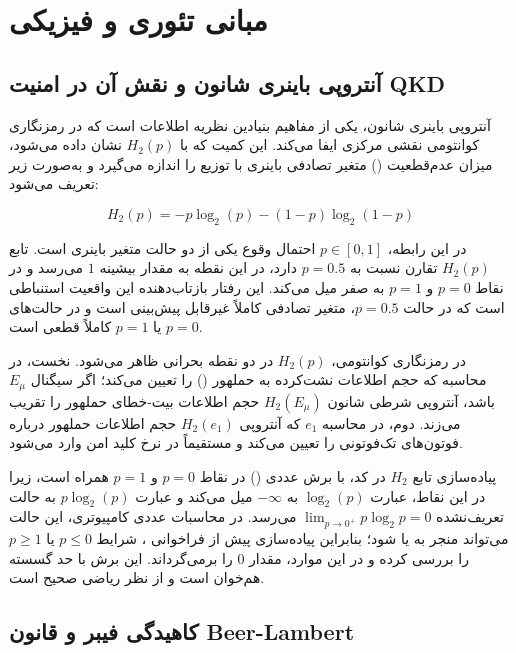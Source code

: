 \section{مبانی تئوری و فیزیکی}

\subsection{آنتروپی باینری شانون و نقش آن در امنیت QKD}

آنتروپی باینری شانون، یکی از مفاهیم بنیادین نظریه اطلاعات است که در رمزنگاری کوانتومی نقشی مرکزی ایفا می‌کند. این کمیت که با $H_2(p)$ نشان داده می‌شود، میزان عدم‌قطعیت () متغیر تصادفی باینری با توزیع  را اندازه می‌گیرد و به‌صورت زیر تعریف می‌شود:

\begin{equation}
	H_2(p) = -p \log_2(p) - (1 - p) \log_2(1 - p)
\end{equation}

در این رابطه، $p \in [0, 1]$ احتمال وقوع یکی از دو حالت متغیر باینری است. تابع $H_2(p)$ تقارن نسبت به $p = 0.5$ دارد، در این نقطه به مقدار بیشینه $1$ می‌رسد و در نقاط $p = 0$ و $p = 1$ به صفر میل می‌کند. این رفتار بازتاب‌دهنده این واقعیت استنباطی است که در حالت $p = 0.5$، متغیر تصادفی کاملاً غیرقابل پیش‌بینی است و در حالت‌های $p = 0$ یا $p = 1$ کاملاً قطعی است.

در رمزنگاری کوانتومی، $H_2(p)$ در دو نقطه بحرانی ظاهر می‌شود. نخست، در محاسبه  که حجم اطلاعات نشت‌کرده به حملهور () را تعیین می‌کند؛ اگر  سیگنال $E_\mu$ باشد، آنتروپی شرطی شانون $H_2(E_\mu)$ حجم اطلاعات بیت-خطای حملهور را تقریب می‌زند. دوم، در محاسبه  $e_1$ که آنتروپی $H_2(e_1)$ حجم اطلاعات حملهور درباره فوتون‌های تک‌فوتونی را تعیین می‌کند و مستقیماً در نرخ کلید امن وارد می‌شود.

پیاده‌سازی تابع $H_2$ در کد، با برش عددی () در نقاط $p = 0$ و $p = 1$ همراه است، زیرا در این نقاط، عبارت $\log_2(p)$ به $-\infty$ میل می‌کند و عبارت $p \log_2(p)$ به حالت تعریف‌نشده $\lim_{p \to 0^+} p \log_2 p = 0$ می‌رسد. در محاسبات عددی کامپیوتری، این حالت می‌تواند منجر به  یا  شود؛ بنابراین پیاده‌سازی پیش از فراخوانی ، شرایط $p \leq 0$ یا $p \geq 1$ را بررسی کرده و در این موارد، مقدار $0$ را برمی‌گرداند. این برش با حد گسسته  هم‌خوان است و از نظر ریاضی صحیح است.

\subsection{کاهیدگی فیبر و قانون Beer-Lambert}

